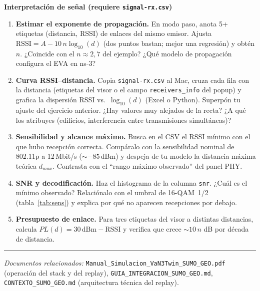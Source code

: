 \documentclass[11pt,a4paper]{article}
\begin{document}
\begin{tareabox}
\textbf{Interpretación de señal (requiere \texttt{signal-rx.csv})}
\begin{enumerate}[leftmargin=1.6em, itemsep=3pt, resume]
  \item \textbf{Estimar el exponente de propagación.} En modo paso, anota 5+
        etiquetas (distancia, RSSI) de enlaces del mismo emisor. Ajusta
        $\mathrm{RSSI}=A-10\,n\log_{10}(d)$ (dos puntos bastan; mejor una
        regresión) y obtén $n$. ¿Coincide con el $n\approx2{,}7$ del ejemplo?
        ¿Qué modelo de propagación configura el EVA en ns-3?
  \item \textbf{Curva RSSI--distancia.} Copia \texttt{signal-rx.csv} al Mac,
        cruza cada fila con la distancia (etiquetas del visor o el campo
        \texttt{receivers\_info} del popup) y grafica la dispersión
        RSSI vs.\ $\log_{10}(d)$ (Excel o Python). Superpón tu ajuste del
        ejercicio anterior. ¿Hay valores muy alejados de la recta? ¿A qué los
        atribuyes (edificios, interferencia entre transmisiones simultáneas)?
  \item \textbf{Sensibilidad y alcance máximo.} Busca en el CSV el RSSI
        mínimo con el que hubo recepción correcta. Compáralo con la
        sensibilidad nominal de 802.11p a 12\,Mbit/s ($\sim -85$\,dBm) y
        despeja de tu modelo la distancia máxima teórica
        $d_{max}$. Contrasta con el ``rango máximo observado'' del panel PHY.
  \item \textbf{SNR y decodificación.} Haz el histograma de la columna
        \texttt{snr}. ¿Cuál es el mínimo observado? Relaciónalo con el umbral
        de 16-QAM~1/2 (tabla~\ref{tab:sens}) y explica por qué no aparecen
        recepciones por debajo.
  \item \textbf{Presupuesto de enlace.} Para tres etiquetas del visor a
        distintas distancias, calcula $PL(d)=30\,\mathrm{dBm}-\mathrm{RSSI}$
        y verifica que crece $\sim 10\,n$ dB por década de distancia.
\end{enumerate}
\end{tareabox}

\vspace{6pt}\hrule\vspace{6pt}

{\small\emph{Documentos relacionados:}
\texttt{Manual\_Simulacion\_VaN3Twin\_SUMO\_GEO.pdf} (operación del stack y
del replay), \texttt{GUIA\_INTEGRACION\_SUMO\_GEO.md},
\texttt{CONTEXTO\_SUMO\_GEO.md} (arquitectura técnica del replay).}
\end{document}
